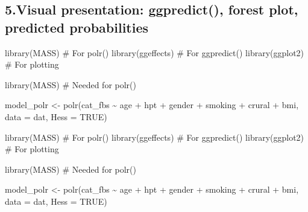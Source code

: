 \documentclass[
  letterpaper,
  DIV=11,
  numbers=noendperiod]{scrartcl}
\newenvironment{Shaded}{\begin{snugshade}}{\end{snugshade}}
\newcommand{\AttributeTok}[1]{\textcolor[rgb]{0.40,0.45,0.13}{#1}}
\newcommand{\CommentTok}[1]{\textcolor[rgb]{0.37,0.37,0.37}{#1}}
\newcommand{\ConstantTok}[1]{\textcolor[rgb]{0.56,0.35,0.01}{#1}}
\newcommand{\FunctionTok}[1]{\textcolor[rgb]{0.28,0.35,0.67}{#1}}
\newcommand{\NormalTok}[1]{\textcolor[rgb]{0.00,0.23,0.31}{#1}}
\newcommand{\OtherTok}[1]{\textcolor[rgb]{0.00,0.23,0.31}{#1}}
\newcommand{\SpecialCharTok}[1]{\textcolor[rgb]{0.37,0.37,0.37}{#1}}
\begin{document}
\subsection{\texorpdfstring{5.Visual presentation: \textbf{ggpredict()},
\textbf{forest plot}, predicted
probabilities}{5.Visual presentation: ggpredict(), forest plot, predicted probabilities}}\label{visual-presentation-ggpredict-forest-plot-predicted-probabilities}

\begin{Shaded}
\begin{Highlighting}[]
\FunctionTok{library}\NormalTok{(MASS)        }\CommentTok{\# For polr()}
\FunctionTok{library}\NormalTok{(ggeffects)   }\CommentTok{\# For ggpredict()}
\FunctionTok{library}\NormalTok{(ggplot2)     }\CommentTok{\# For plotting}
\end{Highlighting}
\end{Shaded}

\begin{Shaded}
\begin{Highlighting}[]
\FunctionTok{library}\NormalTok{(MASS)  }\CommentTok{\# Needed for polr()}

\NormalTok{model\_polr }\OtherTok{\textless{}{-}} \FunctionTok{polr}\NormalTok{(cat\_fbs }\SpecialCharTok{\textasciitilde{}}\NormalTok{ age }\SpecialCharTok{+}\NormalTok{ hpt }\SpecialCharTok{+}\NormalTok{ gender }\SpecialCharTok{+}\NormalTok{ smoking }\SpecialCharTok{+}\NormalTok{ crural }\SpecialCharTok{+}\NormalTok{ bmi, }
                   \AttributeTok{data =}\NormalTok{ dat, }\AttributeTok{Hess =} \ConstantTok{TRUE}\NormalTok{)}
\end{Highlighting}
\end{Shaded}

\begin{Shaded}
\begin{Highlighting}[]
\FunctionTok{library}\NormalTok{(MASS)        }\CommentTok{\# For polr()}
\FunctionTok{library}\NormalTok{(ggeffects)   }\CommentTok{\# For ggpredict()}
\FunctionTok{library}\NormalTok{(ggplot2)     }\CommentTok{\# For plotting}
\end{Highlighting}
\end{Shaded}

\begin{Shaded}
\begin{Highlighting}[]
\FunctionTok{library}\NormalTok{(MASS)  }\CommentTok{\# Needed for polr()}

\NormalTok{model\_polr }\OtherTok{\textless{}{-}} \FunctionTok{polr}\NormalTok{(cat\_fbs }\SpecialCharTok{\textasciitilde{}}\NormalTok{ age }\SpecialCharTok{+}\NormalTok{ hpt }\SpecialCharTok{+}\NormalTok{ gender }\SpecialCharTok{+}\NormalTok{ smoking }\SpecialCharTok{+}\NormalTok{ crural }\SpecialCharTok{+}\NormalTok{ bmi, }
                   \AttributeTok{data =}\NormalTok{ dat, }\AttributeTok{Hess =} \ConstantTok{TRUE}\NormalTok{)}
\end{Highlighting}
\end{Shaded}
\end{document}
